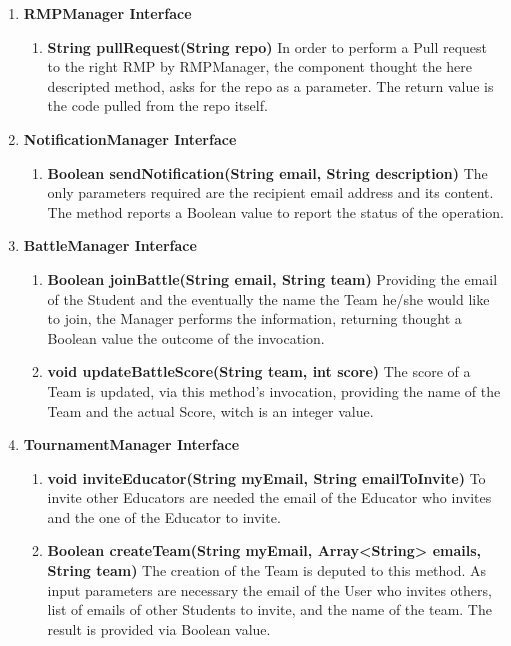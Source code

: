 \begin{enumerate}
    \item \textbf{RMPManager Interface}
        \begin{enumerate}[label=$\bullet$]
            \item \textbf{String pullRequest(String repo)} In order to perform a Pull request to the right RMP by RMPManager, the component thought the here descripted method, asks for the repo as a parameter. The return value is the code pulled from the repo itself.
        \end{enumerate} 
    \item \textbf{NotificationManager Interface}
        \begin{enumerate}[label=$\bullet$]
            \item \textbf{Boolean sendNotification(String email, String description)} The only parameters required are the recipient email address and its content. The method reports a Boolean value to report the status of the operation.
        \end{enumerate}
    \item \textbf{BattleManager Interface}
        \begin{enumerate}[label=$\bullet$]
            \item \textbf{Boolean joinBattle(String email, String team)} Providing the email of the Student and the eventually the name the Team he/she would like to join, the Manager performs the information, returning thought a Boolean value the outcome of the invocation.
            \item \textbf{void updateBattleScore(String team, int score)} The score of a Team is updated, via this method's invocation, providing the name of the Team and the actual Score, witch is an integer value.
        \end{enumerate}
    \item \textbf{TournamentManager Interface}
        \begin{enumerate}[label=$\bullet$]
        \item \textbf{void inviteEducator(String myEmail, String emailToInvite)} To invite other Educators are needed the email of the Educator who invites and the one of the Educator to invite.
        \item \textbf{Boolean createTeam(String myEmail, Array<String> emails, String team)} The creation of the Team is deputed to this method. As input parameters are necessary the email of the User who invites others, list of emails of other Students to invite, and the name of the team. The result is provided via Boolean value. 

\end{enumerate}
\end{enumerate}
